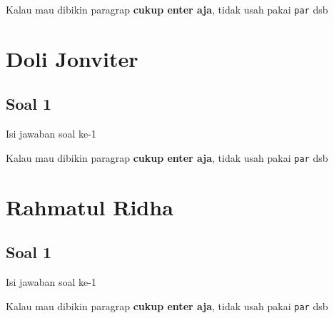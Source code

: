 
Kalau mau dibikin paragrap \textbf{cukup enter aja}, tidak usah pakai \verb|par| dsb



\section{Doli Jonviter}
\subsection{Soal 1}
Isi jawaban soal ke-1

Kalau mau dibikin paragrap \textbf{cukup enter aja}, tidak usah pakai \verb|par| dsb



\section{Rahmatul Ridha}
\subsection{Soal 1}
Isi jawaban soal ke-1

Kalau mau dibikin paragrap \textbf{cukup enter aja}, tidak usah pakai \verb|par| dsb



